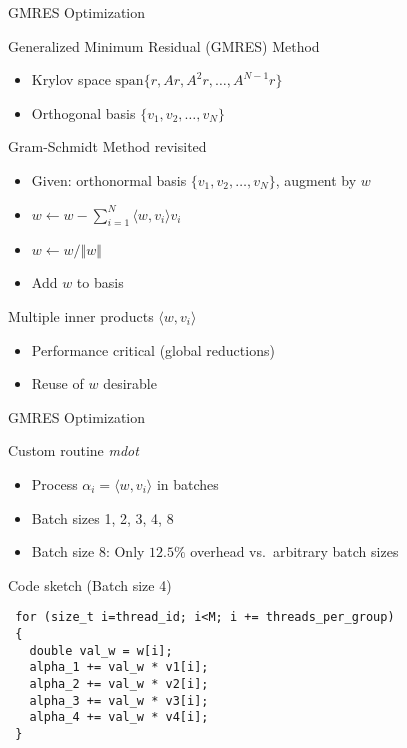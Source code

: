 


\begin{frame}[fragile]{GMRES Optimization}

 \begin{block}{Generalized Minimum Residual (GMRES) Method}
   \begin{itemize}
    \item Krylov space  $\mathrm{span}\{r, Ar, A^2r, \ldots, A^{N-1}r\}$
    \item Orthogonal basis $\{v_1, v_2, \ldots, v_N\}$
   \end{itemize}
 \end{block}

 \begin{block}{Gram-Schmidt Method revisited}
   \begin{itemize}
    \item Given: orthonormal basis $\{v_1, v_2, \ldots, v_N\}$, augment by $w$
    \item $w \leftarrow w - \sum_{i=1}^N \langle w, v_i \rangle v_i$
    \item $w \leftarrow w / \Vert w \Vert$
    \item Add $w$ to basis
   \end{itemize}
 \end{block}

 \begin{block}{Multiple inner products $\langle w, v_i \rangle$}
   \begin{itemize}
    \item Performance critical (global reductions)
    \item Reuse of $w$ desirable
   \end{itemize}
 \end{block}
\end{frame}


\begin{frame}[fragile]{GMRES Optimization}

 \begin{block}{Custom routine \textit{mdot}}
   \begin{itemize}
    \item Process $\alpha_i = \langle w, v_i \rangle$ in batches
    \item Batch sizes 1, 2, 3, 4, 8
    \item Batch size 8: Only $12.5 \%$ overhead vs.~arbitrary batch sizes
   \end{itemize}
 \end{block}

 \begin{block}{Code sketch (Batch size 4)}
 \begin{lstlisting}
 for (size_t i=thread_id; i<M; i += threads_per_group)
 {
   double val_w = w[i];
   alpha_1 += val_w * v1[i];
   alpha_2 += val_w * v2[i];
   alpha_3 += val_w * v3[i];
   alpha_4 += val_w * v4[i];
 }
   \end{lstlisting}
 \end{block}
    

\end{frame}

